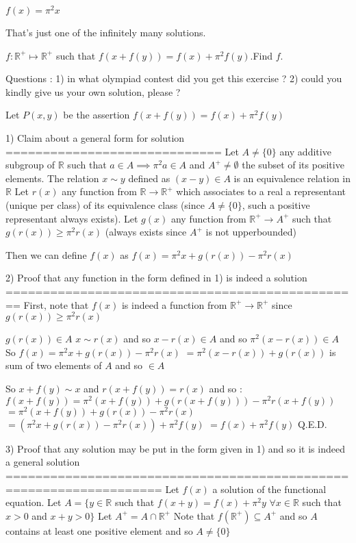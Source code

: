 \begin{solution}
	\begin{tcolorbox}$f(x)={{\pi }^{2}}x$\end{tcolorbox}
That's just one of the infinitely many solutions.
\end{solution}



\begin{solution}
	\begin{tcolorbox}$f:\mathbb{R}^+ \mapsto\mathbb{R}^+$ such that $f(x+f(y))=f(x)+\pi^2 f(y)$.Find $f$.\end{tcolorbox}
Questions :
1) in what olympiad contest did you get this exercise ?
2) could you kindly give us your own solution, please ?

Let $P(x,y)$ be the assertion $f(x+f(y))=f(x)+\pi^2f(y)$

1) Claim about a general form for solution
=============================
Let $A\ne\{0\}$ any additive subgroup of $\mathbb R$ such that $a\in A\implies \pi^2a\in A$ and $A^+\ne\emptyset$ the subset of its positive elements.
The relation $x\sim y$ defined as $(x-y)\in A$ is an equivalence relation in $\mathbb R$
Let $r(x)$ any function from $\mathbb R\to\mathbb R^+$ which associates to a real a representant (unique per class) of its equivalence class (since $A\ne\{0\}$, such a positive representant always exists).
Let $g(x)$ any function from $\mathbb R^+\to A^+$ such that $g(r(x))\ge\pi^2r(x)$  (always exists since $A^+$ is not upperbounded)

Then we can define $f(x)$ as $\boxed{f(x)=\pi^2x+g(r(x))-\pi^2r(x)}$

2) Proof that any function in the form defined in 1) is indeed a solution
================================================
First, note that $f(x)$ is indeed a function from $\mathbb R^+\to\mathbb R^+$ since $g(r(x))\ge\pi^2r(x)$

$g(r(x))\in A$
$x\sim r(x)$ and so $x-r(x)\in A$ and so $\pi^2(x-r(x))\in A$
So ${f(x)=\pi^2x+g(r(x))-\pi^2r(x)}$ $=\pi^2(x-r(x))+g(r(x))$ is sum of two elements of $A$ and so $\in A$

So $x+f(y)\sim x$ and $r(x+f(y))=r(x)$ and so :
$f(x+f(y))=\pi^2(x+f(y))+g(r(x+f(y)))-\pi^2r(x+f(y))$ $=\pi^2(x+f(y))+g(r(x))-\pi^2r(x)$ $=(\pi^2x+g(r(x))-\pi^2r(x))+\pi^2f(y)$ $=f(x)+\pi^2f(y)$
Q.E.D.

3) Proof that any solution may be put in the form given in 1) and so it is indeed a general solution
===================================================================
Let $f(x)$ a solution of the functional equation.
Let $A=\{y\in\mathbb R$ such that $f(x+y)=f(x)+\pi^2y$ $\forall x\in\mathbb R$ such that $x>0$ and $x+y>0\}$
Let $A^+=A\cap\mathbb R^+$
Note that $f(\mathbb R^+)\subseteq A^+$ and so $A$ contains at least one positive element and so $A\ne\{0\}$


\end{solution}
